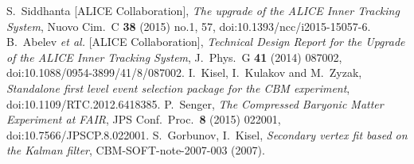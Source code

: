 \documentclass[b5paper,10pt,twoside,oldstyle,classica]{toptesi}
\begin{document}
\begin{thebibliography}{10}
  S.~Siddhanta [ALICE Collaboration],
  \textit{The upgrade of the ALICE Inner Tracking System},
  Nuovo Cim.\ C {\bf 38} (2015) no.1,  57,
  doi:10.1393/ncc/i2015-15057-6.
  B.~Abelev {\it et al.} [ALICE Collaboration],
  \textit{Technical Design Report for the Upgrade of the ALICE Inner Tracking System},
  J.\ Phys.\ G {\bf 41} (2014) 087002,
  doi:10.1088/0954-3899/41/8/087002.
  I.~Kisel, I.~Kulakov and M.~Zyzak,
  \textit{Standalone first level event selection package for the CBM experiment},
  doi:10.1109/RTC.2012.6418385.
  P.~Senger,
  \textit{The Compressed Baryonic Matter Experiment at FAIR},
  JPS Conf.\ Proc.\  {\bf 8} (2015) 022001,
  doi:10.7566/JPSCP.8.022001.
  S.~Gorbunov, I.~Kisel,
  \textit{Secondary vertex fit based on the Kalman filter},
  CBM-SOFT-note-2007-003 (2007).
\end{thebibliography}
\end{document}
